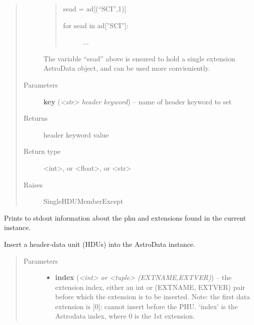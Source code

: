 \documentclass[letterpaper,10pt,english]{sphinxmanual}
\begin{document}
\begin{fulllineitems}
\begin{fulllineitems}
\begin{quote}
\begin{description}
\begin{quote}
sead = ad{[}(``SCI'',1){]}
\begin{description}
\item[{for sead in ad{[}''SCI''{]}:}] \leavevmode
...

\end{description}
\end{quote}

The variable ``sead'' above is ensured to hold a single extension
AstroData object, and can be used more convieniently.

\item[{Parameters}] \leavevmode
\textbf{key} (\emph{\textless{}str\textgreater{} header keyword}) -- name of header keyword to set

\item[{Returns}] \leavevmode
header keyword value

\item[{Return type}] \leavevmode
\textless{}int\textgreater{}, or \textless{}float\textgreater{}, or \textless{}str\textgreater{}

\item[{Raises}] \leavevmode
SingleHDUMemberExcept

\end{description}\end{quote}

\end{fulllineitems}


\begin{fulllineitems}
\label{astro_class:astrodata.AstroData.info}
Prints to stdout information about the phu and extensions found 
in the current instance.

\end{fulllineitems}


\begin{fulllineitems}
\label{astro_class:astrodata.AstroData.insert}
Insert a header-data unit (HDUs) into the AstroData instance.
\begin{quote}\begin{description}
\item[{Parameters}] \leavevmode\begin{itemize}
\item {} 
\textbf{index} (\emph{\textless{}int\textgreater{} or \textless{}tuple\textgreater{} (EXTNAME,EXTVER)}) -- the extension index, either an int or (EXTNAME, EXTVER)
pair before which the extension is to be inserted.
Note: the first data extension is {[}0{]}; cannot insert
before the PHU. `index' is the  Astrodata index, where
0 is the 1st extension.


\end{itemize}
\end{description}
\end{quote}
\end{fulllineitems}
\end{fulllineitems}
\end{document}

